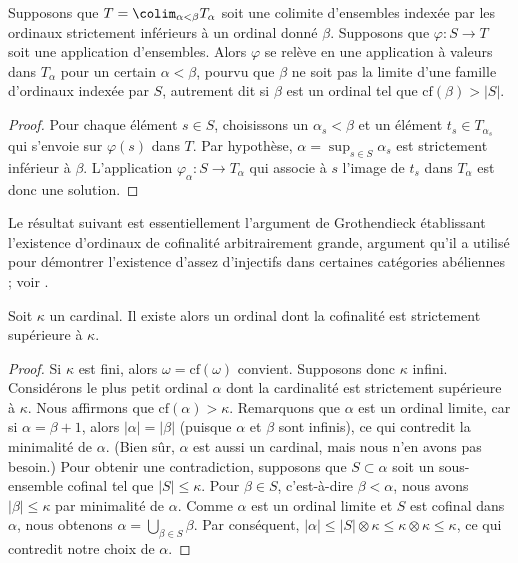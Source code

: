 \begin{lemma}
\label{lemma-map-from-set-lifts}
Supposons que $T = \colim_{\alpha < \beta} T_\alpha$ soit une colimite
d'ensembles indexée par les ordinaux strictement inférieurs à un ordinal donné
$\beta$. Supposons que $\varphi : S \to T$ soit une application d'ensembles.
Alors $\varphi$ se relève en une application à valeurs dans $T_\alpha$ pour un
certain $\alpha < \beta$, pourvu que $\beta$ ne soit pas la limite d'une
famille d'ordinaux indexée par $S$, autrement dit si $\beta$ est un ordinal tel que
$\text{cf}(\beta) > |S|$.
\end{lemma}

\begin{proof}
Pour chaque élément $s \in S$, choisissons un $\alpha_s < \beta$ et un élément
$t_s \in T_{\alpha_s}$ qui s'envoie sur $\varphi(s)$ dans $T$. Par hypothèse,
$\alpha = \sup_{s \in S} \alpha_s$ est strictement inférieur à $\beta$.
L'application $\varphi_\alpha : S \to T_\alpha$ qui associe à $s$ l'image de
$t_s$ dans $T_\alpha$ est donc une solution.
\end{proof}

\noindent
Le résultat suivant est essentiellement l'argument de Grothendieck établissant
l'existence d'ordinaux de cofinalité arbitrairement grande, argument qu'il a
utilisé pour démontrer l'existence d'assez d'injectifs dans certaines
catégories abéliennes ; voir \cite{Tohoku}.

\begin{proposition}
\label{proposition-exist-ordinals-large-cofinality}
Soit $\kappa$ un cardinal. Il existe alors un ordinal dont la cofinalité est
strictement supérieure à $\kappa$.
\end{proposition}

\begin{proof}
Si $\kappa$ est fini, alors $\omega = \text{cf}(\omega)$ convient. Supposons
donc $\kappa$ infini. Considérons le plus petit ordinal $\alpha$ dont la
cardinalité est strictement supérieure à $\kappa$. Nous affirmons que
$\text{cf}(\alpha) > \kappa$. Remarquons que $\alpha$ est un ordinal limite,
car si $\alpha = \beta + 1$, alors $|\alpha| = |\beta|$ (puisque $\alpha$ et
$\beta$ sont infinis), ce qui contredit la minimalité de $\alpha$. (Bien sûr,
$\alpha$ est aussi un cardinal, mais nous n'en avons pas besoin.) Pour obtenir
une contradiction, supposons que $S \subset \alpha$ soit un sous-ensemble
cofinal tel que $|S| \leq \kappa$. Pour $\beta \in S$, c'est-à-dire
$\beta < \alpha$, nous avons $|\beta| \leq \kappa$ par minimalité de $\alpha$.
Comme $\alpha$ est un ordinal limite et $S$ est cofinal dans $\alpha$, nous
obtenons $\alpha = \bigcup_{\beta \in S} \beta$. Par conséquent,
$|\alpha| \leq |S| \otimes \kappa \leq \kappa \otimes \kappa \leq \kappa$,
ce qui contredit notre choix de $\alpha$.
\end{proof}



